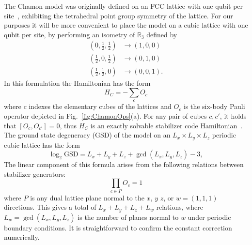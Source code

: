\documentclass[prx,twocolumn,superscriptaddress,nofootinbib,showpacs,notitlepage]{revtex4-2}
\newcommand{\Chamon}{Chamon }
\begin{document}
The \Chamon model was originally defined on an FCC lattice with one qubit per site~\cite{Chamon2005quantum,bravyi2011topological}, exhibiting the tetrahedral point group symmetry of the lattice. For our purposes it will be more convenient to place the model on a cubic lattice with one qubit per site, by performing an isometry of $\mathbb{R}_3$ defined by
\begin{equation}\begin{split}
    \textstyle\left(0,\frac{1}{2},\frac{1}{2}\right)&\to(1,0,0)\\\textstyle\left(\frac{1}{2},0,\frac{1}{2}\right)&\to(0,1,0)\\\textstyle\left(\frac{1}{2},\frac{1}{2},0\right)&\to(0,0,1).
\end{split}\end{equation}
In this formulation the Hamiltonian has the form
\begin{equation}
    H_C=-\sum_c O_c
\end{equation}
where $c$ indexes the elementary cubes of the lattices and $O_c$ is the six-body Pauli operator depicted in Fig.~\ref{fig:ChamonOps}(a). For any pair of cubes $c,c'$, it holds that $\left[O_c,O_{c'}
\right]=0$, thus $H_C$ is an exactly solvable stabilizer code Hamiltonian~\cite{gottesman1997stabilizer}.
The ground state degeneracy (GSD) of the model on an $L_x\times L_y\times L_z$ periodic cubic lattice has the form
\begin{equation}
    \log_2\text{GSD}=L_x+L_y+L_z+\gcd(L_x,L_y,L_z)-3,
    \label{eq:GSD1}
\end{equation}
The linear component of this formula arises from the following relations between stabilizer generators:
\begin{equation}
    \prod_{c\in P}O_c=1
    \label{eq:relations}
\end{equation}
where $P$ is any dual lattice plane normal to the $x$, $y$ $z$, or $w=(1,1,1)$ directions. This gives a total of $L_x+L_y+L_z+L_w$ relations, where $L_w=\gcd(L_x,L_y,L_z)$ is the number of planes normal to $w$ under periodic boundary conditions. It is straightforward to confirm the constant correction numerically.
\end{document}
